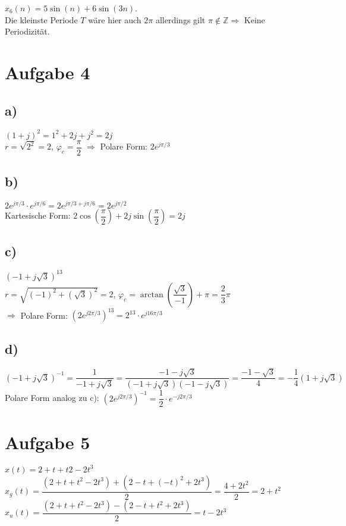 \documentclass[a4paper, fontsize=10pt]{scrartcl}
\begin{document}
$x_6(n)=5\sin (n)+6\sin (3n)$.\\
Die kleinste Periode $T$ wäre hier auch $2\pi $ allerdings gilt $\pi \notin \mathbb{Z}\Rightarrow$ Keine Periodizität. 


\section*{Aufgabe 4}
\subsection*{a)}
$(1+j)^2=1^2+2j+j^2=2j$\\
$r=\sqrt{2^2}=2$, $\varphi_c=\dfrac{\pi}{2}$ $\Rightarrow$ Polare Form: $2e^{j\pi/3}$\bigskip

\subsection*{b)}
$2e^{j\pi/3}\cdot e^{j\pi /6}=2e^{j\pi /3 + j\pi/6}=2e^{j\pi/2} $\\
Kartesische Form: $2\cos\left(\dfrac{\pi}{2}\right)+2j\sin\left(\dfrac{\pi}{2}\right)=2j$\bigskip 

\subsection*{c)}
$(-1+j\sqrt{3})^{13}$\\
$r=\sqrt{(-1)^2+(\sqrt{3})^2}=2$, $\varphi_c=\arctan\left(\dfrac{\sqrt{3}}{-1}\right)+\pi=\dfrac{2}{3}\pi$\\
$\Rightarrow$ Polare Form: $\left(2e^{j2\pi/3}\right)^{13}=2^{13}\cdot e^{j16\pi/3}$\bigskip 

\subsection*{d)}
$\left(-1+j\sqrt{3}\right)^{-1}=\dfrac{1}{-1+j\sqrt{3}}=\dfrac{-1-j\sqrt{3}}{\left(-1+j\sqrt{3}\right)\left(-1-j\sqrt{3}\right)}=\dfrac{-1-\sqrt{3}}{4}=-\dfrac{1}{4}\left(1+j\sqrt{3}\right)$\\
Polare Form analog zu c):
$\left(2e^{j2\pi/3}\right)^{-1}=\dfrac{1}{2}\cdot e^{-j2\pi/3}$

\section*{Aufgabe 5}

$x(t)=2+t+t2-2t^3$\\
$x_g(t)=\dfrac{\left(2+t+t^2-2t^3\right)+\left(2-t+(-t)^2+2t^3\right)}{2}=\dfrac{4+2t^2}{2}=2+t^2$\\
$x_u(t)=\dfrac{\left(2+t+t^2-2t^3\right)-\left(2-t+t^2+2t^3\right)}{2}=t-2t^3$\bigskip
\end{document}
